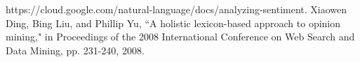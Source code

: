 \documentclass[conference]{IEEEtran}
\begin{document}
\begin{thebibliography}{00}
		 https://cloud.google.com/natural-language/docs/analyzing-sentiment.
		 Xiaowen Ding, Bing Liu, and Phillip Yu, ``A holistic lexicon-based approach to opinion mining," in Proceedings of the 2008 International Conference on Web Search and Data Mining, pp. 231-240, 2008.

\end{thebibliography}
\end{document}
